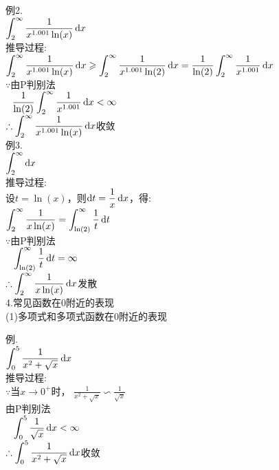 例2.\\
$\displaystyle\int_2^{\infty}\frac{1}{x^{1.001}\ln(x)}\mathop{}\!\mathrm{d} x$\\
推导过程:\\
$\displaystyle\int_2^{\infty}\frac{1}{x^{1.001}\ln(x)}\mathop{}\!\mathrm{d} x\geqslant\int_2^{\infty}\frac{1}{x^{1.001}\ln(2)}\mathop{}\!\mathrm{d} x=\frac{1}{\ln(2)}\int_2^{\infty}\frac{1}{x^{1.001}}\mathop{}\!\mathrm{d} x$\\
$\because$由P判别法\\
$\displaystyle\phantom{\because}\frac{1}{\ln(2)}\int_2^{\infty}\frac{1}{x^{1.001}}\mathop{}\!\mathrm{d} x<\infty$\\
$\displaystyle\therefore\int_2^{\infty}\frac{1}{x^{1.001}\ln(x)}\mathop{}\!\mathrm{d} x$收敛\\[1ex]

例3.\\
$\displaystyle\int_2^{\infty}\mathop{}\!\mathrm{d} x$\\
推导过程:\\
设$t=\ln(x)$，则$\mathop{}\!\mathrm{d} t=\dfrac{1}{x}\mathop{}\!\mathrm{d} x$，得:\\
$\displaystyle\int_2^{\infty}\frac{1}{x\ln(x)}=\int_{\ln(2)}^{\infty}\frac{1}{t}\mathop{}\!\mathrm{d} t$\\
$\because$由P判别法\\
$\displaystyle\phantom{\because}\int_{\ln(2)}^{\infty}\frac{1}{t}\mathop{}\!\mathrm{d} t=\infty$\\
$\displaystyle\therefore\int_2^{\infty}\frac{1}{x\ln(x)}\mathop{}\!\mathrm{d} x$发散\\[4ex]

4.常见函数在$0$附近的表现\\
(1)多项式和多项式函数在$0$附近的表现\\
\begin{center}
\end{center}
例.\\
$\displaystyle\int_0^5\frac{1}{x^2+\sqrt{x}}\mathop{}\!\mathrm{d} x$\\
推导过程:\\
$\because$当$x\to 0^+$时， $\displaystyle\frac{1}{x^2+\sqrt{x}}\backsim\frac{1}{\sqrt{x}}$\\
\phantom{$\because$}由P判别法\\
$\displaystyle\phantom{\because}\int_0^5\frac{1}{\sqrt{x}}\mathop{}\!\mathrm{d} x<\infty$\\
$\displaystyle\therefore\int_0^5\frac{1}{x^2+\sqrt{x}}\mathop{}\!\mathrm{d} x$收敛\\[2ex]


